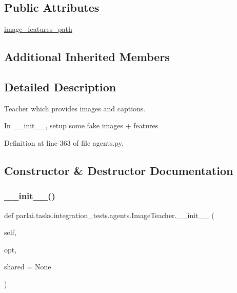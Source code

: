 \subsection*{Public Attributes}
\begin{DoxyCompactItemize}
\item 
\hyperlink{classparlai_1_1tasks_1_1integration__tests_1_1agents_1_1ImageTeacher_a252433e0d09c09207362b031aa295696}{image\+\_\+features\+\_\+path}
\end{DoxyCompactItemize}
\subsection*{Additional Inherited Members}


\subsection{Detailed Description}
\begin{DoxyVerb}Teacher which provides images and captions.

In __init__, setup some fake images + features
\end{DoxyVerb}
 

Definition at line 363 of file agents.\+py.



\subsection{Constructor \& Destructor Documentation}
\mbox{\label{classparlai_1_1tasks_1_1integration__tests_1_1agents_1_1ImageTeacher_a3341d0d235586140b1c0c231a21182ff}} 
\subsubsection{\texorpdfstring{\+\_\+\+\_\+init\+\_\+\+\_\+()}{\_\_init\_\_()}}
{\footnotesize\ttfamily def parlai.\+tasks.\+integration\+\_\+tests.\+agents.\+Image\+Teacher.\+\_\+\+\_\+init\+\_\+\+\_\+ (\begin{DoxyParamCaption}\item[{}]{self,  }\item[{}]{opt,  }\item[{}]{shared = {\ttfamily None} }\end{DoxyParamCaption})}



